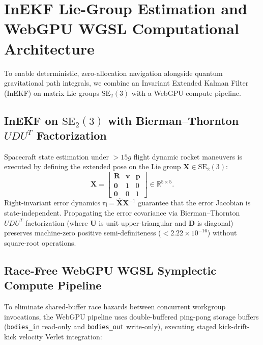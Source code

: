 \documentclass[11pt,a4paper,reqno]{article}
\theoremstyle{plain}
\theoremstyle{definition}
\theoremstyle{remark}
\numberwithin{equation}{section}
\begin{document}
\section{InEKF Lie-Group Estimation and WebGPU WGSL Computational Architecture}
\label{sec:computational_architecture}

To enable deterministic, zero-allocation navigation alongside quantum gravitational path integrals, we combine an Invariant Extended Kalman Filter (InEKF) on matrix Lie groups $\mathrm{SE}_2(3)$ with a WebGPU compute pipeline.

\subsection{InEKF on \texorpdfstring{$\mathrm{SE}_2(3)$}{SE2(3)} with Bierman--Thornton \texorpdfstring{$UDU^T$}{UDU(T)} Factorization}
\label{subsec:inekf_se23}

Spacecraft state estimation under $> 15g$ flight dynamic rocket maneuvers is executed by defining the extended pose on the Lie group $\mathbf{X} \in \mathrm{SE}_2(3)$:
\begin{equation}
  \mathbf{X} = \begin{bmatrix} \mathbf{R} & \mathbf{v} & \mathbf{p} \\ \mathbf{0} & 1 & 0 \\ \mathbf{0} & 0 & 1 \end{bmatrix} \in \mathbb{R}^{5 \times 5}.
\end{equation}
Right-invariant error dynamics $\bm{\eta} = \hat{\mathbf{X}} \mathbf{X}^{-1}$ guarantee that the error Jacobian is state-independent. Propagating the error covariance via Bierman--Thornton $UDU^T$ factorization (where $\mathbf{U}$ is unit upper-triangular and $\mathbf{D}$ is diagonal) preserves machine-zero positive semi-definiteness ($< 2.22 \times 10^{-16}$) without square-root operations.

\subsection{Race-Free WebGPU WGSL Symplectic Compute Pipeline}
\label{subsec:webgpu_wgsl}

To eliminate shared-buffer race hazards between concurrent workgroup invocations, the WebGPU pipeline uses double-buffered ping-pong storage buffers (\texttt{bodies\_in} read-only and \texttt{bodies\_out} write-only), executing staged kick-drift-kick velocity Verlet integration:
\end{document}
